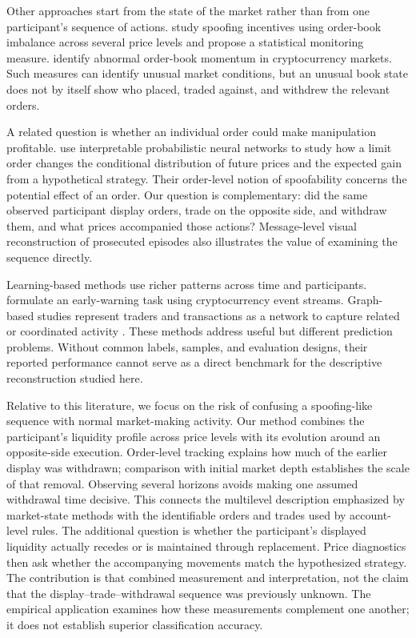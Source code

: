 \documentclass[11pt]{article}
\begin{document}
Other approaches start from the state of the market rather than from one participant's sequence of actions. \cite{TaoDayLingDrapeau2022} study spoofing incentives using order-book imbalance across several price levels and propose a statistical monitoring measure. \cite{LiPolukarovaVentre2023} identify abnormal order-book momentum in cryptocurrency markets. Such measures can identify unusual market conditions, but an unusual book state does not by itself show who placed, traded against, and withdrew the relevant orders.

A related question is whether an individual order could make manipulation profitable. \cite{FabreChallet2025} use interpretable probabilistic neural networks to study how a limit order changes the conditional distribution of future prices and the expected gain from a hypothetical strategy. Their order-level notion of spoofability concerns the potential effect of an order. Our question is complementary: did the same observed participant display orders, trade on the opposite side, and withdraw them, and what prices accompanied those actions? Message-level visual reconstruction of prosecuted episodes \cite{DebieEtAl2023} also illustrates the value of examining the sequence directly.

Learning-based methods use richer patterns across time and participants. \cite{TuccellaNadlerSerban2021} formulate an early-warning task using cryptocurrency event streams. Graph-based studies represent traders and transactions as a network to capture related or coordinated activity \cite{KangMuNing2023,KangMuNing2024,XiangEtAl2025}. These methods address useful but different prediction problems. Without common labels, samples, and evaluation designs, their reported performance cannot serve as a direct benchmark for the descriptive reconstruction studied here.

Relative to this literature, we focus on the risk of confusing a spoofing-like sequence with normal market-making activity. Our method combines the participant's liquidity profile across price levels with its evolution around an opposite-side execution. Order-level tracking explains how much of the earlier display was withdrawn; comparison with initial market depth establishes the scale of that removal. Observing several horizons avoids making one assumed withdrawal time decisive. This connects the multilevel description emphasized by market-state methods with the identifiable orders and trades used by account-level rules. The additional question is whether the participant's displayed liquidity actually recedes or is maintained through replacement. Price diagnostics then ask whether the accompanying movements match the hypothesized strategy. The contribution is that combined measurement and interpretation, not the claim that the display--trade--withdrawal sequence was previously unknown. The empirical application examines how these measurements complement one another; it does not establish superior classification accuracy.
\end{document}

